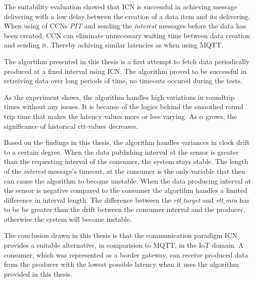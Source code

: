 The suitability evaluation showed that ICN is successful in achieving message delivering with a low delay between the creation of a data item and its delivering. When using of CCNs \textit{PIT} and sending the \textit{interest} messages before the data has been created, CCN can eliminate unnecessary waiting time between data creation and sending it. Thereby achiving similar latencies as when using MQTT.

The algortihm presented in this thesis is a first attempt to fetch data periodically produced at a fixed interval using ICN. The algorithm proved to be successful in retreiving data over long periods of time, no timeouts occured during the tests. %

As the experiment shows, the algorithm handles high variations in roundtrip times without any issues. It is because of the logics behind the smoothed round trip time that makes the latency values more or less varying. As $\alpha$ grows, the significance of historical rtt-values decreases. 

Based on the findings in this thesis, the algorithm handles variances in clock drift to a certain degree. When the data publishing interval at the sensor is greater than the requesting interval of the consumer, the system stays stable. The length of the \textit{interest} message's timeout, at the consumer is the only variable that then can cause the algorithm to become unstable. When the data producing interval at the sensor is negative compared to the consumer the algortihm handles a limited difference in interval length. The difference between the \textit{rtt$\_$target} and \textit{rtt$\_$min} has to be be greater than the drift between the consumer interval and the producer, otherwise the system will become instable.

The conclusion drawn in this thesis is that the communication paradigm ICN provides a suitable alternative, in comparision to MQTT, in the IoT domain. A consumer, which was represented as a border gateway, can receive produced data from the producer with the lowest possible latency when it uses the algorithm provided in this thesis. 


